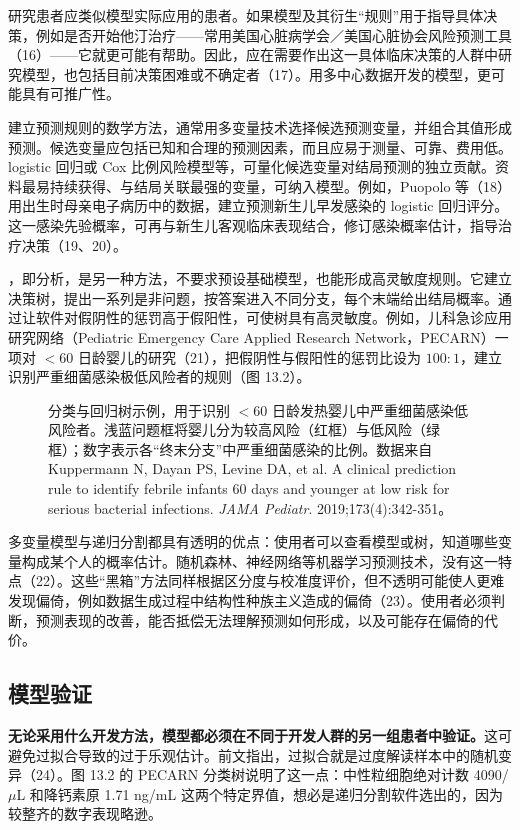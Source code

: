 研究患者应类似模型实际应用的患者。如果模型及其衍生“规则”用于指导具体决策，例如是否开始他汀治疗——常用美国心脏病学会／美国心脏协会风险预测工具（16）——它就更可能有帮助。因此，应在需要作出这一具体临床决策的人群中研究模型，也包括目前决策困难或不确定者（17）。用多中心数据开发的模型，更可能具有可推广性。

建立预测规则的数学方法，通常用多变量技术选择候选预测变量，并组合其值形成预测。候选变量应包括已知和合理的预测因素，而且应易于测量、可靠、费用低。logistic 回归或 Cox 比例风险模型等，可量化候选变量对结局预测的独立贡献。资料最易持续获得、与结局关联最强的变量，可纳入模型。例如，Puopolo 等（18）用出生时母亲电子病历中的数据，建立预测新生儿早发感染的 logistic 回归评分。这一感染先验概率，可再与新生儿客观临床表现结合，修订感染概率估计，指导治疗决策（19、20）。

，即分析，是另一种方法，不要求预设基础模型，也能形成高灵敏度规则。它建立决策树，提出一系列是非问题，按答案进入不同分支，每个末端给出结局概率。通过让软件对假阴性的惩罚高于假阳性，可使树具有高灵敏度。例如，儿科急诊应用研究网络（Pediatric Emergency Care Applied Research Network，PECARN）一项对 $<60$ 日龄婴儿的研究（21），把假阴性与假阳性的惩罚比设为 $100:1$，建立识别严重细菌感染极低风险者的规则（图 13.2）。

\par
\begin{figure}[htbp]\centering\chthirteentree
\caption{分类与回归树示例，用于识别 $<60$ 日龄发热婴儿中严重细菌感染低风险者。浅蓝问题框将婴儿分为较高风险（红框）与低风险（绿框）；数字表示各“终末分支”中严重细菌感染的比例。数据来自 Kuppermann N, Dayan PS, Levine DA, et al. A clinical prediction rule to identify febrile infants 60 days and younger at low risk for serious bacterial infections. \textit{JAMA Pediatr}. 2019;173(4):342-351。}\label{fig:13_02}\end{figure}\par

多变量模型与递归分割都具有透明的优点：使用者可以查看模型或树，知道哪些变量构成某个人的概率估计。随机森林、神经网络等机器学习预测技术，没有这一特点（22）。这些“黑箱”方法同样根据区分度与校准度评价，但不透明可能使人更难发现偏倚，例如数据生成过程中结构性种族主义造成的偏倚（23）。使用者必须判断，预测表现的改善，能否抵偿无法理解预测如何形成，以及可能存在偏倚的代价。

\subsection{模型验证}
\textbf{无论采用什么开发方法，模型都必须在不同于开发人群的另一组患者中验证。}这可避免过拟合导致的过于乐观估计。前文指出，过拟合就是过度解读样本中的随机变异（24）。图 13.2 的 PECARN 分类树说明了这一点：中性粒细胞绝对计数 4090/$\mu$L 和降钙素原 1.71 ng/mL 这两个特定界值，想必是递归分割软件选出的，因为较整齐的数字表现略逊。

